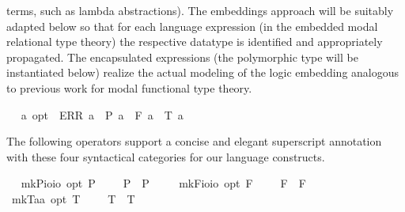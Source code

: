 \begin{isabellebody}
\begin{isamarkuptext}
  terms, such as lambda abstractions). The embeddings approach will be suitably adapted below so that 
  for each language expression (in the embedded modal relational type theory) the respective datatype 
  is identified and appropriately propagated. The encapsulated expressions (the polymorphic type  
  will be instantiated below) realize the actual modeling of the logic embedding analogous 
  to previous work for modal functional type theory.%
\end{isamarkuptext}%
\isamarkuptrue%
\ \isamarkupfalse%
\ {\isacharprime}a\ opt\ {\isacharequal}\ ERR\ {\isacharprime}a\ {\isacharbar}\ P\ {\isacharprime}a\ {\isacharbar}\ F\ {\isacharprime}a\ {\isacharbar}\ T\ {\isacharprime}a%
\begin{isamarkuptext}%
The following operators support a concise and elegant superscript annotation with these
  four syntactical categories for our language constructs.%
\end{isamarkuptext}%
\isamarkuptrue%
\ \isamarkupfalse%
\ mkP{\isacharcolon}{\isacharcolon}{\isachardoublequoteopen}io{\isasymRightarrow}io\ opt{\isachardoublequoteclose}\ {\isacharparenleft}{\isachardoublequoteopen}{\isacharunderscore}\isactrlsup P{\isachardoublequoteclose}\ {\isacharbrackleft}{}{}{}{\isacharbrackright}\ {}{}{}{\isacharparenright}\ \ \ {\isachardoublequoteopen}{\isasymphi}\isactrlsup P\ {\isasymequiv}\ P\ {\isasymphi}{\isachardoublequoteclose}\ \isanewline
\ \isamarkupfalse%
\ mkF{\isacharcolon}{\isacharcolon}{\isachardoublequoteopen}io{\isasymRightarrow}io\ opt{\isachardoublequoteclose}\ {\isacharparenleft}{\isachardoublequoteopen}{\isacharunderscore}\isactrlsup F{\isachardoublequoteclose}\ {\isacharbrackleft}{}{}{}{\isacharbrackright}\ {}{}{}{\isacharparenright}\ \ \ {\isachardoublequoteopen}{\isasymphi}\isactrlsup F\ {\isasymequiv}\ F\ {\isasymphi}{\isachardoublequoteclose}\ \isanewline
\ \isamarkupfalse%
\ mkT{\isacharcolon}{\isacharcolon}{\isachardoublequoteopen}{\isacharprime}a{\isasymRightarrow}{\isacharprime}a\ opt{\isachardoublequoteclose}\ {\isacharparenleft}{\isachardoublequoteopen}{\isacharunderscore}\isactrlsup T{\isachardoublequoteclose}\ {\isacharbrackleft}{}{}{}{\isacharbrackright}\ {}{}{}{\isacharparenright}\ \ \ {\isachardoublequoteopen}{\isasymphi}\isactrlsup T\ {\isasymequiv}\ T\ {\isasymphi}{\isachardoublequoteclose}\isanewline

\end{isabellebody}
